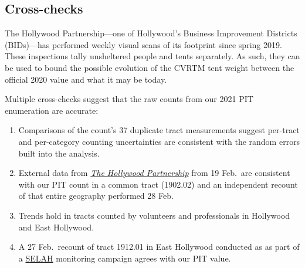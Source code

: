 \documentclass[11pt,twocolumn]{article}
\begin{document}
\subsection{Cross-checks}
\label{sec:crossChecks}

The Hollywood Partnership---one of Hollywood's Business Improvement Districts (BIDs)---has performed
weekly visual scans of its footprint since spring 2019. These inspections tally unsheltered people and 
tents separately. As such, they can be used to bound the possible evolution of the CVRTM tent weight
between the official 2020 value and what it may be today.

Multiple cross-checks suggest that the raw counts from our 2021 PIT enumeration are accurate:
\begin{enumerate}
	\item Comparisons of the count's 37 duplicate tract measurements suggest per-tract and per-category
		counting uncertainties are consistent with the random errors built into the analysis.
	\item External data from \href{https://hollywoodpartnership.com/}{\it The Hollywood Partnership} 
		from 19 Feb.\ are consistent with our PIT count in a common tract (1902.02) and an independent 
		recount of that entire geography performed 28 Feb.%
	\item Trends hold in tracts counted by volunteers and professionals in Hollywood and East Hollywood.
	\item A 27 Feb.\ recount of tract 1912.01 in East Hollywood conducted as as part of a
		\href{https://selahnch.org}{SELAH} monitoring campaign agrees with our PIT value.%
\end{enumerate}
\end{document}
